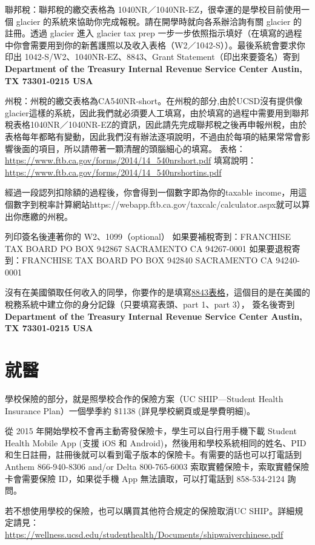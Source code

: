 \documentclass[10pt,a4paper]{book}
\begin{document}
\begin{CJK}{UTF8}{bkai}
聯邦稅：聯邦稅的繳交表格為 1040NR／1040NR-EZ，很幸運的是學校目前使用一個 glacier 的系統來協助你完成報稅。請在開學時就向各系辦洽詢有關 glacier 的註冊。透過 glacier 進入 glacier tax prep 一步一步依照指示填好（在填寫的過程中你會需要用到你的新舊護照以及收入表格（W2／1042-S））。最後系統會要求你印出 1042-S/W2、1040NR-EZ、8843、Grant Statement（印出來要簽名）寄到
\textbf{Department of the Treasury
Internal Revenue Service Center
Austin, TX 73301-0215
USA}

州稅：州稅的繳交表格為CA540NR-short。在州稅的部分,由於UCSD沒有提供像glacier這樣的系統，因此我們就必須要人工填寫，由於填寫的過程中需要用到聯邦稅表格1040NR／1040NR-EZ的資訊，因此請先完成聯邦稅之後再申報州稅，由於表格每年都略有變動，因此我們沒有辦法逐項說明，不過由於每項的結果常常會影響後面的項目，所以請帶著一顆清醒的頭腦細心的填寫。
表格：\url{https://www.ftb.ca.gov/forms/2014/14_540nrshort.pdf}
填寫說明：\url{https://www.ftb.ca.gov/forms/2014/14_540nrshortins.pdf}

經過一段認列扣除額的過程後，你會得到一個數字即為你的taxable income，用這個數字到稅率計算網站https://webapp.ftb.ca.gov/taxcalc/calculator.aspx就可以算出你應繳的州稅。

列印簽名後連著你的 W2、1099（optional）
如果要補稅寄到：FRANCHISE TAX BOARD PO BOX 942867 SACRAMENTO CA 94267-0001
如果要退稅寄到：FRANCHISE TAX BOARD PO BOX 942840 SACRAMENTO CA 94240-0001 

沒有在美國領取任何收入的同學，你要作的是填寫\href{http://www.irs.gov/pub/irs-pdf/f8843.pdf}{8843表格}，這個目的是在美國的稅務系統中建立你的身分記錄（只要填寫表頭、part 1、part 3）， 簽名後寄到
\textbf{Department of the Treasury
Internal Revenue Service Center
Austin, TX 73301-0215
USA}

\section{就醫}

學校保險的部分，就是照學校合作的保險方案（UC SHIP---Student Health Insurance Plan）一個學季約 \$1138 (詳見學校網頁或是學費明細)。

從 2015 年開始學校不會再主動寄發保險卡，學生可以自行用手機下載 Student Health Mobile App (支援 iOS 和 Android)，然後用和學校系統相同的姓名、PID 和生日註冊，註冊後就可以看到電子版本的保險卡。有需要的話也可以打電話到 Anthem 866-940-8306 and/or Delta 800-765-6003 索取實體保險卡，索取實體保險卡會需要保險 ID，如果從手機 App 無法讀取，可以打電話到 858-534-2124 詢問。

若不想使用學校的保險，也可以購買其他符合規定的保險取消UC SHIP。詳細規定請見：\url{https://wellness.ucsd.edu/studenthealth/Documents/shipwaiverchinese.pdf}


\end{CJK}
\end{document}
